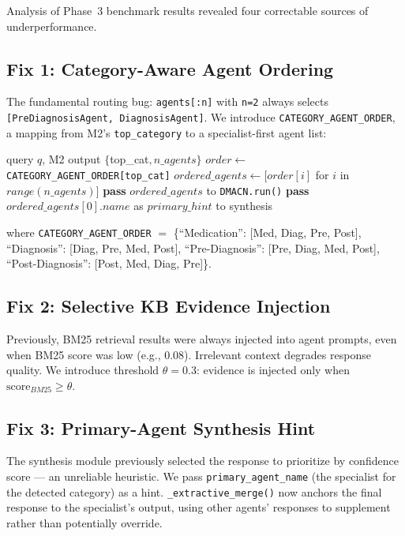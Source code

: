 \documentclass[conference]{IEEEtran}
\begin{document}
Analysis of Phase~3 benchmark results revealed four correctable sources of underperformance.

\subsection{Fix 1: Category-Aware Agent Ordering}
\label{sec:fix1}
The fundamental routing bug: \texttt{agents[:n]} with \texttt{n=2} always selects \texttt{[PreDiagnosisAgent, DiagnosisAgent]}. We introduce \texttt{CATEGORY\_AGENT\_ORDER}, a mapping from M2's \texttt{top\_category} to a specialist-first agent list:

\begin{algorithm}[H]
\caption{Category-Aware Agent Selection}
\label{alg:routing}
\begin{algorithmic}[1]
\REQUIRE query $q$, M2 output $\{$top\_cat$, n\_agents\}$
\STATE $order \leftarrow$ \texttt{CATEGORY\_AGENT\_ORDER[top\_cat]}
\STATE $ordered\_agents \leftarrow [order[i]$ for $i$ in $range(n\_agents)]$
\STATE \textbf{pass} $ordered\_agents$ to \texttt{DMACN.run()}
\STATE \textbf{pass} $ordered\_agents[0].name$ as $primary\_hint$ to synthesis
\end{algorithmic}
\end{algorithm}

\noindent where \texttt{CATEGORY\_AGENT\_ORDER} $=$ \{``Medication'': [Med, Diag, Pre, Post], ``Diagnosis'': [Diag, Pre, Med, Post], ``Pre-Diagnosis'': [Pre, Diag, Med, Post], ``Post-Diagnosis'': [Post, Med, Diag, Pre]\}.

\subsection{Fix 2: Selective KB Evidence Injection}
Previously, BM25 retrieval results were always injected into agent prompts, even when BM25 score was low (e.g., 0.08). Irrelevant context degrades response quality. We introduce threshold $\theta = 0.3$: evidence is injected only when $\text{score}_{BM25} \geq \theta$.

\subsection{Fix 3: Primary-Agent Synthesis Hint}
The synthesis module previously selected the response to prioritize by confidence score — an unreliable heuristic. We pass \texttt{primary\_agent\_name} (the specialist for the detected category) as a hint. \texttt{\_extractive\_merge()} now anchors the final response to the specialist's output, using other agents' responses to supplement rather than potentially override.
\end{document}
